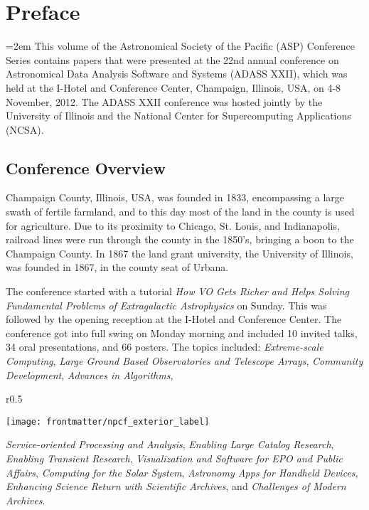 \pagestyle{myheadings}
\thispagestyle{plain}
\section*{\Large\bfseries Preface}
\bigskip
\parindent=2em
\setcounter{section}{1}
\noindent 
This volume of the Astronomical Society of the Pacific (ASP) Conference Series contains papers that were presented at the 22nd annual conference on Astronomical Data Analysis Software and Systems (ADASS XXII), which was held at the I-Hotel and Conference Center, Champaign, Illinois, USA, on 4-8 November, 2012. The ADASS XXII conference was hosted jointly by the University of Illinois and the National Center for Supercomputing Applications (NCSA).

\subsection{Conference Overview}
Champaign County, Illinois, USA, was founded in 1833, encompassing a large swath of fertile farmland, and to this day most of the land in the county is used for agriculture. Due to its proximity to Chicago, St. Louis, and Indianapolis, railroad lines were run through the county in the 1850's, bringing a boon to the Champaign County. In 1867 the land grant university, the University of Illinois, was founded in 1867, in the county seat of Urbana.

The conference started with a tutorial {\it How VO Gets Richer and Helps Solving Fundamental Problems of Extragalactic Astrophysics} on Sunday. This was followed by the opening reception at the I-Hotel and Conference Center. The conference got into full swing on Monday morning and included 10 invited talks, 34 oral presentations, and 66 posters. The topics included: \textit{Extreme-scale Computing}, \textit{Large Ground Based Observatories and Telescope Arrays}, \textit{Community Development}, \textit{Advances in Algorithms},
\begin{wrapfigure}[24]{r}{0.5\textwidth}
\vspace{-20pt}
  \begin{center}
    \texttt{[image: frontmatter/npcf\_exterior\_label]}
  \end{center}
\end{wrapfigure}
 \textit{Service-oriented Processing and Analysis}, \textit{Enabling Large Catalog Research}, \textit{Enabling Transient Research}, \textit{Visualization and Software for EPO and Public Affairs}, \textit{Computing for the Solar System}, \textit{Astronomy Apps for Handheld Devices}, \textit{Enhancing Science Return with Scientific Archives}, and \textit{Challenges of Modern Archives}.

